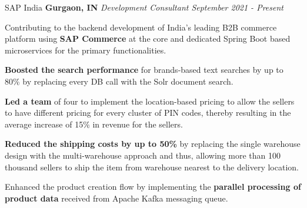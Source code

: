 
\begin{cventries2}


  \cventrynew
    {SAP India}  {\bf {Gurgaon, IN}}
    {\textnormal{\textit{Development Consultant  \hfill {September 2021 - Present}}}}
    {
      \begin{cvitems} %
        \item {Contributing to the backend development of India’s leading B2B commerce platform using {\bf SAP Commerce} at the core and dedicated Spring Boot based microservices for the primary functionalities.}
        \item{{\bf Boosted the search performance} for brands-based text searches by up to 80\% by replacing every DB call with the Solr document search.}
        \item {{\bf Led a team} of four to implement the location-based pricing to allow the sellers to have different pricing for every cluster of PIN codes, thereby resulting in the average increase of 15\% in revenue for the sellers.}
        \item { {\bf Reduced the shipping costs by up to 50\%} by replacing the single warehouse design with the multi-warehouse approach and thus, allowing more than 100 thousand sellers to ship the item from warehouse nearest to the delivery location.}
        \item {Enhanced the product creation flow by implementing the {\bf parallel processing of product data} received from Apache Kafka messaging queue.}
      \end{cvitems}
    }    
\vspace{10pt} 


\end{cventries2}
